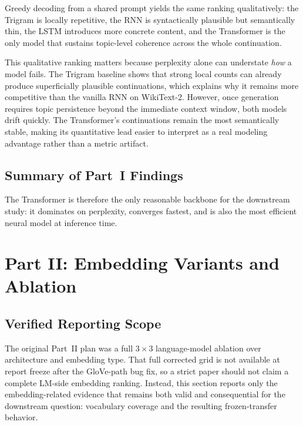 \documentclass[10pt,a4paper]{article}
\begin{document}
Greedy decoding from a shared prompt yields the same ranking qualitatively: the Trigram is locally repetitive, the RNN is syntactically plausible but semantically thin, the LSTM introduces more concrete content, and the Transformer is the only model that sustains topic-level coherence across the whole continuation.

This qualitative ranking matters because perplexity alone can understate \emph{how} a model fails. The Trigram baseline shows that strong local counts can already produce superficially plausible continuations, which explains why it remains more competitive than the vanilla RNN on WikiText-2. However, once generation requires topic persistence beyond the immediate context window, both models drift quickly. The Transformer's continuations remain the most semantically stable, making its quantitative lead easier to interpret as a real modeling advantage rather than a metric artifact.

\subsection{Summary of Part~I Findings}
\label{sec:part1_summary}

The Transformer is therefore the only reasonable backbone for the downstream study: it dominates on perplexity, converges fastest, and is also the most efficient neural model at inference time.

\FloatBarrier


\section{Part II: Embedding Variants and Ablation}
\label{sec:part2}

\subsection{Verified Reporting Scope}
\label{sec:part2_scope}

The original Part~II plan was a full $3 \times 3$ language-model ablation over architecture and embedding type. That full corrected grid is not available at report freeze after the GloVe-path bug fix, so a strict paper should not claim a complete LM-side embedding ranking. Instead, this section reports only the embedding-related evidence that remains both valid and consequential for the downstream question: vocabulary coverage and the resulting frozen-transfer behavior.
\end{document}
